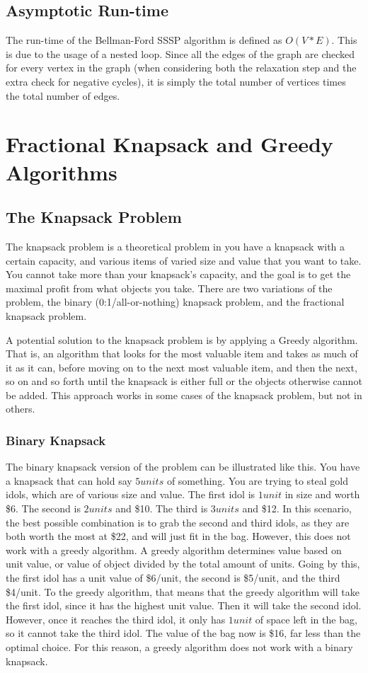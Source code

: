 \documentclass[letterpaper, 10pt,DIV=13]{scrartcl}
\numberwithin{equation}{section} %
\numberwithin{figure}{section} %
\numberwithin{table}{section} %
\begin{document}
\subsection{Asymptotic Run-time}
The run-time of the Bellman-Ford SSSP algorithm is defined as $O(V*E)$. This is due to the usage of a nested loop. Since all the edges of the graph are checked for every vertex in the graph (when considering both the relaxation step and the extra check for negative cycles), it is simply the total number of vertices times the total number of edges.

\section{Fractional Knapsack and Greedy Algorithms}
\subsection{The Knapsack Problem}
The knapsack problem is a theoretical problem in you have a knapsack with a certain capacity, and various items of varied size and value that you want to take. You cannot take more than your knapsack's capacity, and the goal is to get the maximal profit from what objects you take. There are two variations of the problem, the binary (0:1/all-or-nothing) knapsack problem, and the fractional knapsack problem.

A potential solution to the knapsack problem is by applying a Greedy algorithm. That is, an algorithm that looks for the most valuable item and takes as much of it as it can, before moving on to the next most valuable item, and then the next, so on and so forth until the knapsack is either full or the objects otherwise cannot be added. This approach works in some cases of the knapsack problem, but not in others.

\subsubsection{Binary Knapsack}
The binary knapsack version of the problem can be illustrated like this. You have a knapsack that can hold say $5 units$ of something. You are trying to steal gold idols, which are of various size and value. The first idol is $1 unit$ in size and worth \$6. The second is $2 units$ and \$10. The third is $3 units$ and \$12. In this scenario, the best possible combination is to grab the second and third idols, as they are both worth the most at \$22, and will just fit in the bag. However, this does not work with a greedy algorithm. A greedy algorithm determines value based on unit value, or value of object divided by the total amount of units. Going by this, the first idol has a unit value of \$6/unit, the second is \$5/unit, and the third \$4/unit. To the greedy algorithm, that means that the greedy algorithm will take the first idol, since it has the highest unit value. Then it will take the second idol. However, once it reaches the third idol, it only has $1 unit$ of space left in the bag, so it cannot take the third idol. The value of the bag now is \$16, far less than the optimal choice. For this reason, a greedy algorithm does not work with a binary knapsack.
\end{document}
